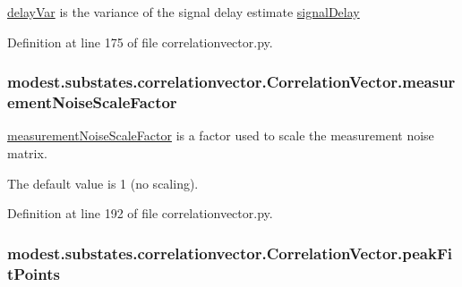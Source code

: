 \hyperlink{classmodest_1_1substates_1_1correlationvector_1_1CorrelationVector_ab0c6ffbea793ae20593e85d033341595}{delay\+Var} is the variance of the signal delay estimate \hyperlink{classmodest_1_1substates_1_1correlationvector_1_1CorrelationVector_aa1565b9972d60149f335e3b923cac371}{signal\+Delay} 



Definition at line 175 of file correlationvector.\+py.

\subsubsection[{\texorpdfstring{measurement\+Noise\+Scale\+Factor}{measurementNoiseScaleFactor}}]{\setlength{\rightskip}{0pt plus 5cm}modest.\+substates.\+correlationvector.\+Correlation\+Vector.\+measurement\+Noise\+Scale\+Factor}\hypertarget{classmodest_1_1substates_1_1correlationvector_1_1CorrelationVector_ae1c71753aea17170b58bd9fabc62c037}{}\label{classmodest_1_1substates_1_1correlationvector_1_1CorrelationVector_ae1c71753aea17170b58bd9fabc62c037}


\hyperlink{classmodest_1_1substates_1_1correlationvector_1_1CorrelationVector_ae1c71753aea17170b58bd9fabc62c037}{measurement\+Noise\+Scale\+Factor} is a factor used to scale the measurement noise matrix. 

The default value is 1 (no scaling). 

Definition at line 192 of file correlationvector.\+py.

\subsubsection[{\texorpdfstring{peak\+Fit\+Points}{peakFitPoints}}]{\setlength{\rightskip}{0pt plus 5cm}modest.\+substates.\+correlationvector.\+Correlation\+Vector.\+peak\+Fit\+Points}\hypertarget{classmodest_1_1substates_1_1correlationvector_1_1CorrelationVector_af2be8d7129fd0453208af5268fdddc22}{}\label{classmodest_1_1substates_1_1correlationvector_1_1CorrelationVector_af2be8d7129fd0453208af5268fdddc22}


